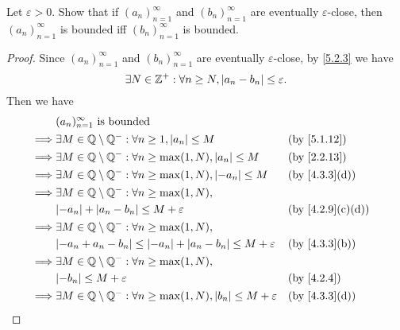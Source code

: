 \begin{ex}\label{ex:5.2.2}
  Let \(\varepsilon > 0\).
  Show that if \((a_n)_{n = 1}^{\infty}\) and \((b_n)_{n = 1}^{\infty}\) are eventually \(\varepsilon\)-close, then \((a_n)_{n = 1}^{\infty}\) is bounded iff \((b_n)_{n = 1}^{\infty}\) is bounded.
\end{ex}

\begin{proof}
  Since \((a_n)_{n = 1}^{\infty}\) and \((b_n)_{n = 1}^{\infty}\) are eventually \(\varepsilon\)-close, by \cref{5.2.3} we have
  \[
    \exists N \in \mathbb{Z}^+ : \forall n \geq N, \left\lvert a_n - b_n\right\rvert \leq \varepsilon.
  \]
  Then we have
  \begin{align*}
             & (a_n)_{n = 1}^\infty \text{ is bounded}                                                                                         \\
    \implies & \exists M \in \Q \setminus \Q^- : \forall n \geq 1, \abs{a_n} \leq M                        &  & \by{5.1.12}                    \\
    \implies & \exists M \in \Q \setminus \Q^- : \forall n \geq \max(1, N), \abs{a_n} \leq M               &  & \by{2.2.13}                    \\
    \implies & \exists M \in \Q \setminus \Q^- : \forall n \geq \max(1, N), \abs{-a_n} \leq M              &  & \text{(by \cref{4.3.3}(d))}    \\
    \implies & \exists M \in \Q \setminus \Q^- : \forall n \geq \max(1, N),                                                                    \\
             & \abs{-a_n} + \abs{a_n - b_n} \leq M + \varepsilon                                           &  & \text{(by \cref{4.2.9}(c)(d))} \\
    \implies & \exists M \in \Q \setminus \Q^- : \forall n \geq \max(1, N),                                                                    \\
             & \abs{-a_n + a_n - b_n} \leq \abs{-a_n} + \abs{a_n - b_n} \leq M + \varepsilon               &  & \text{(by \cref{4.3.3}(b))}    \\
    \implies & \exists M \in \Q \setminus \Q^- : \forall n \geq \max(1, N),                                                                    \\
             & \abs{-b_n} \leq M + \varepsilon                                                             &  & \by{4.2.4}                     \\
    \implies & \exists M \in \Q \setminus \Q^- : \forall n \geq \max(1, N), \abs{b_n} \leq M + \varepsilon &  & \text{(by \cref{4.3.3}(d))}    \\

\end{align*}
\end{proof}
